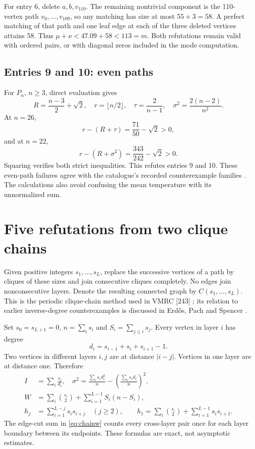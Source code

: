 \documentclass[11pt,a4paper]{article}
\theoremstyle{remark}\newtheorem{remark}[theorem]{Remark}
\begin{document}
For entry 6, delete $a,b,v_{110}$. The remaining nontrivial component is
the 110-vertex path $v_0,\ldots,v_{109}$, so any matching has size at most
$55+3=58$. A perfect matching of that path and one leaf edge at each of
the three deleted vertices attains 58. Thus
$\mu+\nu<47.09+58<113=m$. Both refutations remain valid with ordered
pairs, or with diagonal zeros included in the mode computation.

\subsection{Entries 9 and 10: even paths}
For $P_n$, $n\ge3$, direct evaluation gives
\[
 R=\frac{n-3}{2}+\sqrt2,\quad r=\lfloor n/2\rfloor,\quad
 \tau=\frac2{n-1},\quad \sigma^2=\frac{2(n-2)}{n^2}.
\]
At $n=26$,
\[
 r-(R+\tau)=\frac{71}{50}-\sqrt2>0,
\]
and at $n=22$,
\[
 r-(R+\sigma^2)=\frac{343}{242}-\sqrt2>0.
\]
Squaring verifies both strict inequalities. This refutes entries 9 and 10.
These even-path failures agree with the catalogue's recorded counterexample
families \cite{wow,caporossi}. The calculations also avoid confusing the
mean temperature with its unnormalized sum.

\section{Five refutations from two clique chains}\label{sec:chains}
Given positive integers $s_1,\ldots,s_L$, replace the successive vertices of
a path by cliques of these sizes and join consecutive cliques completely.
No edges join nonconsecutive layers. Denote the resulting connected graph
by $C(s_1,\ldots,s_L)$. This is the periodic clique-chain method used in
VMRC [243] \cite{vmrc243}; its relation to earlier inverse-degree
counterexamples is discussed in Erd\H{o}s, Pach and Spencer \cite{eps}.

Set $s_0=s_{L+1}=0$, $n=\sum_i s_i$ and $S_i=\sum_{j\le i}s_j$.
Every vertex in layer $i$ has degree
\[
 d_i=s_{i-1}+s_i+s_{i+1}-1.
\]
Two vertices in different layers $i,j$ are at distance $|i-j|$.
Vertices in one layer are at distance one. Therefore
\begin{align}
 I&=\sum_i\frac{s_i}{d_i},\quad
 \sigma^2=\frac{\sum_i s_i d_i^2}{n}
                 -\left(\frac{\sum_i s_i d_i}{n}\right)^2,\label{eq:chaindegree}\\
 W&=\sum_i\binom{s_i}{2}+\sum_{i=1}^{L-1}S_i(n-S_i),\label{eq:chainw}\\
 h_j&=\sum_{i=1}^{L-j}s_i s_{i+j}\quad(j\ge2),\qquad
 h_1=\sum_i\binom{s_i}{2}+\sum_{i=1}^{L-1}s_i s_{i+1}.\label{eq:chainhist}
\end{align}
The edge-cut sum in \eqref{eq:chainw} counts every cross-layer pair once
for each layer boundary between its endpoints. These formulas are exact,
not asymptotic estimates.
\end{document}
